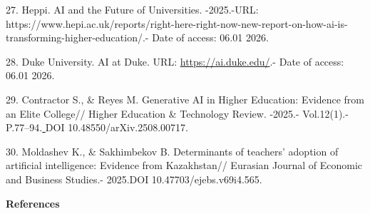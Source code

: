 \begin{refs}
27. Heppi. AI and the Future of Universities. -2025.-URL:
https://www.hepi.ac.uk/reports/right-here-right-now-new-report-on-how-ai-is-transforming-higher-education/.-
Date of access: 06.01 2026.

28. Duke University. AI at Duke. URL: \url{https://ai.duke.edu/}.- Date
of access: 06.01 2026.

29. Contractor S., \& Reyes M. Generative AI in Higher Education:
Evidence from an Elite College// Higher Education \& Technology Review.
-2025.- Vol.12(1).- P.77--94.\ul{\hfill\break
}DOI 10.48550/arXiv.2508.00717.

30. Moldashev K., \& Sakhimbekov B. Determinants of teachers' adoption
of artificial intelligence: Evidence from Kazakhstan// Eurasian Journal
of Economic and Business Studies.- 2025.DOI 10.47703/ejebs.v69i4.565.
\end{refs}

\begin{center}
{\bfseries References}
\end{center}

